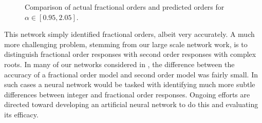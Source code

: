 \begin{figure}
\centering

\vspace*{-5pt}
\caption{Comparison of actual fractional orders and predicted orders for $\alpha
\in \left[0.95,2.05\right]$.}
\label{fig:extrapolate}
\end{figure}

This network simply identified fractional orders, albeit very accurately. A much
more challenging problem, stemming from our large scale network work, is to
distinguish fractional order responses with second order responses with complex
roots. In many of our networks considered in
\cite{goodwinemed2023,goodwinemmar2023}, the difference between the accuracy of
a fractional order model and second order model was fairly small. In such cases
a neural network would be tasked with identifying much more subtle differences
between integer and fractional order responses. Ongoing efforts are directed
toward developing an artificial neural network to do this and evaluating its
efficacy.  
